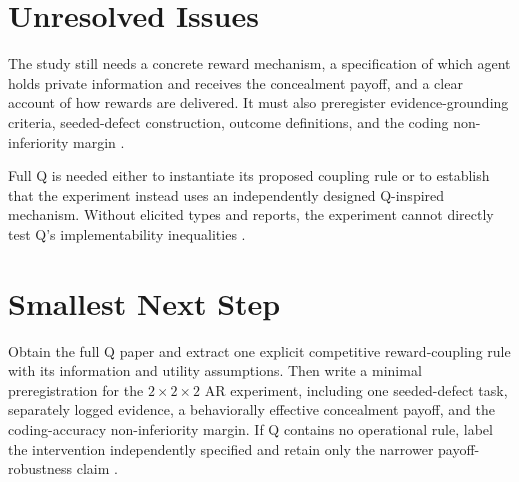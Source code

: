 \documentclass{article}
\begin{document}
\section{Unresolved Issues}

The study still needs a concrete reward mechanism, a specification of which agent holds private information and receives the concealment payoff, and a clear account of how rewards are delivered. It must also preregister evidence-grounding criteria, seeded-defect construction, outcome definitions, and the coding non-inferiority margin .

Full Q is needed either to instantiate its proposed coupling rule or to establish that the experiment instead uses an independently designed Q-inspired mechanism. Without elicited types and reports, the experiment cannot directly test Q's implementability inequalities .

\section{Smallest Next Step}

Obtain the full Q paper and extract one explicit competitive reward-coupling rule with its information and utility assumptions. Then write a minimal preregistration for the \(2\times2\times2\) AR experiment, including one seeded-defect task, separately logged evidence, a behaviorally effective concealment payoff, and the coding-accuracy non-inferiority margin. If Q contains no operational rule, label the intervention independently specified and retain only the narrower payoff-robustness claim .
\end{document}

